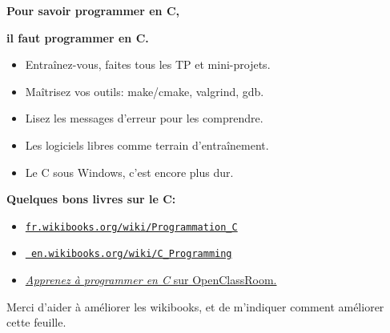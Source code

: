 \documentclass[a4paper,10pt,landscape]{article}
\newcommand{\Subsection}[1]{{\textbf{#1}}}
\begin{document}
\begin{multicols}{3}

  \centerline{\bf\large Pour savoir programmer en C,}
  \centerline{\bf\large il faut programmer en C.}
  \begin{itemize}[noitemsep]
  \item Entraînez-vous, faites tous les TP et mini-projets.
  \item Maîtrisez vos outils: make/cmake, valgrind, gdb.
  \item Lisez les messages d'erreur pour les comprendre.
  \item Les logiciels libres comme terrain d'entraînement.
  \item Le C sous Windows, c'est encore plus dur.
  \end{itemize}

  \Subsection{Quelques bons livres sur le C:}
  \begin{itemize}[noitemsep,nolistsep]
  \item \href{https://fr.wikibooks.org/wiki/Programmation_C}{\tt fr.wikibooks.org/wiki/Programmation\_C}
  \item \href{https://en.wikibooks.org/wiki/C_Programming}{\tt
      en.wikibooks.org/wiki/C\_Programming}
     
  \item
    \href{https://openclassrooms.com/courses/apprenez-a-programmer-en-c}
    {{\it Apprenez à programmer en C} sur OpenClassRoom.}
  \end{itemize}

  \bigskip %
  Merci d'aider à améliorer les wikibooks, et de m'indiquer comment
  améliorer cette feuille.  %
  \vfill

  ~
  \columnbreak %

  \vfill

  \vfill
  
  \vfill

  \columnbreak %

\end{multicols} 
\end{document}
